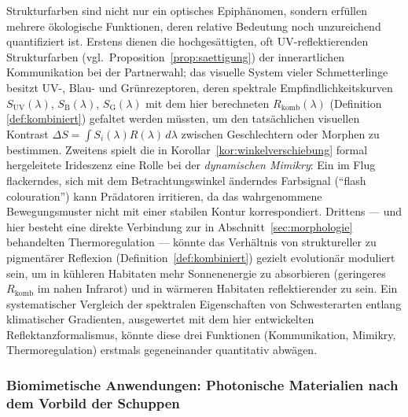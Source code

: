 ﻿\documentclass[a4paper,12pt]{article}
\theoremstyle{definition}
\begin{document}
	Strukturfarben sind nicht nur ein optisches Epiphänomen, sondern
	erfüllen mehrere ökologische Funktionen, deren relative Bedeutung noch
	unzureichend quantifiziert ist. Erstens dienen die hochgesättigten,
	oft UV-reflektierenden Strukturfarben (vgl.\
	Proposition~\ref{prop:saettigung}) der innerartlichen
	Kommunikation bei der Partnerwahl; das visuelle System vieler
	Schmetterlinge besitzt UV-, Blau- und Grünrezeptoren, deren
	spektrale Empfindlichkeitskurven $S_{\mathrm{UV}}(\lambda)$,
	$S_{\mathrm{B}}(\lambda)$, $S_{\mathrm{G}}(\lambda)$ mit dem hier
	berechneten $R_{\mathrm{komb}}(\lambda)$ (Definition
	\ref{def:kombiniert}) gefaltet werden müssten, um den tatsächlichen
	visuellen Kontrast $\Delta S = \int S_i(\lambda) R(\lambda)\,d\lambda$
	zwischen Geschlechtern oder Morphen zu bestimmen. Zweitens spielt die
	in Korollar~\ref{kor:winkelverschiebung} formal hergeleitete
	Irideszenz eine Rolle bei der \emph{dynamischen Mimikry}: Ein im Flug
	flackerndes, sich mit dem Betrachtungswinkel änderndes Farbsignal
	(``flash colouration'') kann Prädatoren irritieren, da das
	wahrgenommene Bewegungsmuster nicht mit einer stabilen Kontur
	korrespondiert. Drittens --- und hier besteht eine direkte Verbindung
	zur in Abschnitt~\ref{sec:morphologie} behandelten Thermoregulation
	--- könnte das Verhältnis von struktureller zu pigmentärer
	Reflexion (Definition~\ref{def:kombiniert}) gezielt evolutionär
	moduliert sein, um in kühleren Habitaten mehr Sonnenenergie zu
	absorbieren (geringeres $R_{\mathrm{komb}}$ im nahen Infrarot) und in
	wärmeren Habitaten reflektierender zu sein. Ein systematischer
	Vergleich der spektralen Eigenschaften von Schwesterarten entlang
	klimatischer Gradienten, ausgewertet mit dem hier entwickelten
	Reflektanzformalismus, könnte diese drei Funktionen (Kommunikation,
	Mimikry, Thermoregulation) erstmals gegeneinander quantitativ
	abwägen.

	\subsubsection{Biomimetische Anwendungen: Photonische Materialien nach dem Vorbild der Schuppen}
	\label{sec:ausblick_biomimetik}
\end{document}
